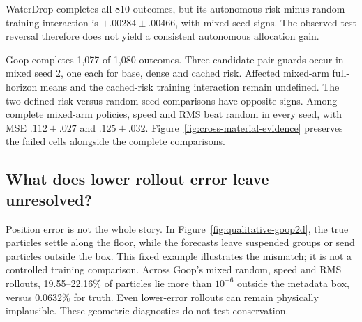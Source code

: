WaterDrop completes all 810 outcomes, but its autonomous risk-minus-random training interaction is $+.00284\pm.00466$, with mixed seed signs. The observed-test reversal therefore does not yield a consistent autonomous allocation gain. 

Goop completes 1,077 of 1,080 outcomes. Three candidate-pair guards occur in mixed seed 2, one each for base, dense and cached risk. Affected mixed-arm full-horizon means and the cached-risk training interaction remain undefined. The two defined risk-versus-random seed comparisons have opposite signs. Among complete mixed-arm policies, speed and RMS beat random in every seed, with MSE $.112\pm.027$ and $.125\pm.032$. Figure~\ref{fig:cross-material-evidence} preserves the failed cells alongside the complete comparisons.

\subsection{What does lower rollout error leave unresolved?}
Position error is not the whole story. In Figure~\ref{fig:qualitative-goop2d}, the true particles settle along the floor, while the forecasts leave suspended groups or send particles outside the box. This fixed example illustrates the mismatch; it is not a controlled training comparison. Across Goop's mixed random, speed and RMS rollouts, 19.55--22.16\% of particles lie more than $10^{-6}$ outside the metadata box, versus $0.0632\%$ for truth. Even lower-error rollouts can remain physically implausible. These geometric diagnostics do not test conservation.



